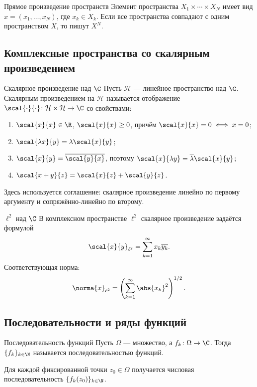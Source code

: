 \begin{Remark}{Прямое произведение пространств}{}
	Элемент пространства $X_1\times\cdots\times X_N$ имеет вид $x=(x_1,\ldots,x_N)$, где $x_k\in X_k$. Если все пространства совпадают с одним пространством $X$, то пишут $X^N$.
\end{Remark}

\subsection{Комплексные пространства со скалярным произведением}

\begin{Definition}{Скалярное произведение над $\C$}{}
	Пусть $\mathcal H$ --- линейное пространство над $\C$. Скалярным произведением на $\mathcal H$ называется отображение $\scal{\cdot}{\cdot}\colon \mathcal H\times\mathcal H\to\C$ со свойствами:
	
	\begin{enumerate}
		\item $\scal{x}{x}\in\R$, $\scal{x}{x}\ge0$, причём $\scal{x}{x}=0\iff x=0$;
		\item $\scal{\lambda x}{y}=\lambda\scal{x}{y}$;
		\item $\scal{x}{y}=\overline{\scal{y}{x}}$, поэтому $\scal{x}{\lambda y}=\overline\lambda\scal{x}{y}$;
		\item $\scal{x+y}{z}=\scal{x}{z}+\scal{y}{z}$.
	\end{enumerate}
	
	Здесь используется соглашение: скалярное произведение линейно по первому аргументу и сопряжённо-линейно по второму.
\end{Definition}

\begin{Example}{$\ell^2$ над $\C$}{}
	В комплексном пространстве $\ell^2$ скалярное произведение задаётся формулой
	\[
	\scal{x}{y}_{\ell^2}
	=
	\sum_{k=1}^{\infty}x_k\overline{y_k}.
	\]
	Соответствующая норма:
	\[
	\norma{x}_{\ell^2}
	=
	\left(\sum_{k=1}^{\infty}\abs{x_k}^2\right)^{1/2}.
	\]
\end{Example}

\subsection{Последовательности и ряды функций}

\begin{Definition}{Последовательность функций}{}
	Пусть $\Omega$ --- множество, а $f_k\colon\Omega\to\C$. Тогда $\{f_k\}_{k\in\N}$ называется последовательностью функций.
	
	Для каждой фиксированной точки $z_0\in\Omega$ получается числовая последовательность $\{f_k(z_0)\}_{k\in\N}$.
\end{Definition}

